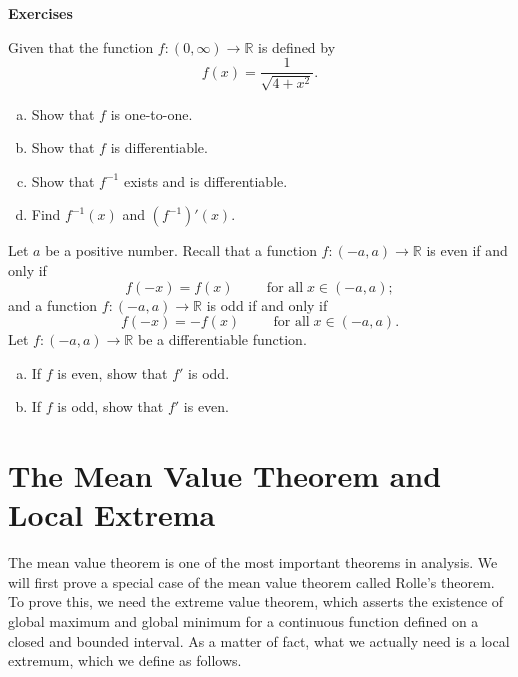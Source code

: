 \vp
\noindent 
{\bf \large Exercises  \thesection}
\setcounter{myquestion}{1}
\begin{question}{\themyquestion}
Given that the function $f:(0,\infty)\to \mathbb{R}$ is defined by
\[f(x)=\frac{1}{\sqrt{4+x^2}}.\]
\begin{enumerate}[(a)]
\item Show that $f$ is one-to-one.
\item Show that $f$ is differentiable.
\item Show that $f^{-1}$ exists and is differentiable.
\item Find $f^{-1}(x)$ and $(f^{-1})'(x)$.
\end{enumerate}
\end{question}

\atc


\begin{question}{\themyquestion}
Let $a$ be a positive number. 
Recall that a function $f:(-a, a)\to\mathbb{R}$ is even if and only if
\[f(-x)=f(x)\hspace{1cm}\text{for all}\;x\in (-a,a);\]
and a function $f:(-a, a)\to\mathbb{R}$ is odd if and only if
\[f(-x)=-f(x)\hspace{1cm}\text{for all}\;x\in (-a,a).\]
Let $f:(-a,a)\to\mathbb{R}$ be a differentiable function.
\begin{enumerate}[(a)]
\item If $f$ is even, show that $f'$ is odd.
\item If $f$ is odd, show that $f'$ is even.

\end{enumerate}
\end{question}
\vp

\section{The Mean Value Theorem  and Local Extrema}\label{sec3.3}

The mean value theorem is one of the most important theorems in analysis. 
We will first prove a special case of the mean value theorem called Rolle's theorem. To prove this, we need the extreme value theorem, which asserts the existence of global maximum and global minimum for a continuous function defined on a closed and bounded interval. As a matter of fact, what we actually need is a local extremum, which we define as follows.

 

